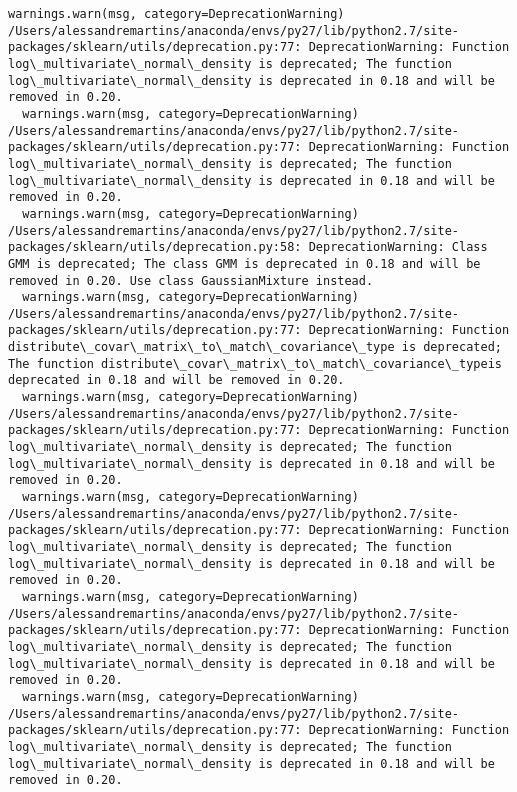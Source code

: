 \documentclass[11pt]{article}
\begin{document}
\begin{Verbatim}[commandchars=\\\{\}]
  warnings.warn(msg, category=DeprecationWarning)
/Users/alessandremartins/anaconda/envs/py27/lib/python2.7/site-packages/sklearn/utils/deprecation.py:77: DeprecationWarning: Function log\_multivariate\_normal\_density is deprecated; The function log\_multivariate\_normal\_density is deprecated in 0.18 and will be removed in 0.20.
  warnings.warn(msg, category=DeprecationWarning)
/Users/alessandremartins/anaconda/envs/py27/lib/python2.7/site-packages/sklearn/utils/deprecation.py:77: DeprecationWarning: Function log\_multivariate\_normal\_density is deprecated; The function log\_multivariate\_normal\_density is deprecated in 0.18 and will be removed in 0.20.
  warnings.warn(msg, category=DeprecationWarning)
/Users/alessandremartins/anaconda/envs/py27/lib/python2.7/site-packages/sklearn/utils/deprecation.py:58: DeprecationWarning: Class GMM is deprecated; The class GMM is deprecated in 0.18 and will be  removed in 0.20. Use class GaussianMixture instead.
  warnings.warn(msg, category=DeprecationWarning)
/Users/alessandremartins/anaconda/envs/py27/lib/python2.7/site-packages/sklearn/utils/deprecation.py:77: DeprecationWarning: Function distribute\_covar\_matrix\_to\_match\_covariance\_type is deprecated; The function distribute\_covar\_matrix\_to\_match\_covariance\_typeis deprecated in 0.18 and will be removed in 0.20.
  warnings.warn(msg, category=DeprecationWarning)
/Users/alessandremartins/anaconda/envs/py27/lib/python2.7/site-packages/sklearn/utils/deprecation.py:77: DeprecationWarning: Function log\_multivariate\_normal\_density is deprecated; The function log\_multivariate\_normal\_density is deprecated in 0.18 and will be removed in 0.20.
  warnings.warn(msg, category=DeprecationWarning)
/Users/alessandremartins/anaconda/envs/py27/lib/python2.7/site-packages/sklearn/utils/deprecation.py:77: DeprecationWarning: Function log\_multivariate\_normal\_density is deprecated; The function log\_multivariate\_normal\_density is deprecated in 0.18 and will be removed in 0.20.
  warnings.warn(msg, category=DeprecationWarning)
/Users/alessandremartins/anaconda/envs/py27/lib/python2.7/site-packages/sklearn/utils/deprecation.py:77: DeprecationWarning: Function log\_multivariate\_normal\_density is deprecated; The function log\_multivariate\_normal\_density is deprecated in 0.18 and will be removed in 0.20.
  warnings.warn(msg, category=DeprecationWarning)
/Users/alessandremartins/anaconda/envs/py27/lib/python2.7/site-packages/sklearn/utils/deprecation.py:77: DeprecationWarning: Function log\_multivariate\_normal\_density is deprecated; The function log\_multivariate\_normal\_density is deprecated in 0.18 and will be removed in 0.20.

\end{Verbatim}
\end{document}
